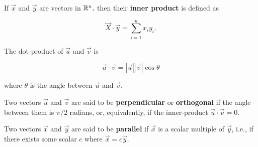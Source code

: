 \documentclass{article}
\begin{document}
\begin{definition}
If $\vec{x}$ and $\vec{y}$ are \@{vectors} in $\mathbb{R}^n,$ then their \textbf{inner product} is defined as

\[ \vec{X} \cdot \vec{y} = \sum_{i = 1}^n x_i y_i. \]
\end{definition}

\begin{theorem}\label{cos-characterization-of-dot-product}
The \@{dot-product} of $\vec{u}$ and $\vec{v}$ is

\[ \vec{u} \cdot \vec{v} = |\vec{u}||\vec{v}|\cos{\theta} \]

where $\theta$ is the angle between $\vec{u}$ and $\vec{v}.$
\end{theorem}

\begin{definition}[Perpendicular]
Two \@{vectors} $\vec{u}$ and $\vec{v}$ are said to be \textbf{perpendicular} or \textbf{orthogonal} if the angle between them is $\pi/2$ radians, or, equivalently, if the \@{inner-product} $\vec{u} \cdot \vec{v} = 0.$
\end{definition}

\begin{definition}[Parallel]
Two \@{vectors} $\vec{x}$ and $\vec{y}$ are said to be \textbf{parallel} if $\vec{x}$ is a \@{scalar} multiple of $\vec{y}$, i.e., if there exists some scalar $c$ where $\vec{x} = c \vec{y}.$
\end{definition}
\end{document}
